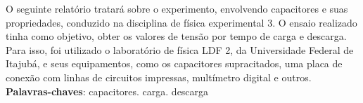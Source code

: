 \begin{resumo}
O seguinte relatório tratará sobre o experimento, envolvendo capacitores 
e suas propriedades, conduzido na disciplina de física experimental 3.
 O ensaio realizado tinha como objetivo, obter os valores de tensão por
tempo de carga e descarga. Para isso, foi utilizado o laboratório de 
física LDF 2, da Universidade Federal de Itajubá, e seus equipamentos, 
como os capacitores supracitados, uma placa de conexão com linhas de 
circuitos impressas, multímetro digital e outros.\\

  \textbf{Palavras-chaves}: capacitores. carga. descarga

\end{resumo}


	






